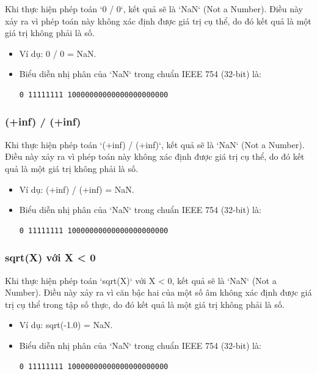 Khi thực hiện phép toán `0 / 0`, kết quả sẽ là `NaN` (Not a Number). Điều này xảy ra vì phép toán này không xác định được giá trị cụ thể, do đó kết quả là một giá trị không phải là số.

\begin{itemize}
	\item Ví dụ: 0 / 0 = NaN.
	\item Biểu diễn nhị phân của `NaN` trong chuẩn IEEE 754 (32-bit) là:
	      \begin{verbatim}
0 11111111 10000000000000000000000
\end{verbatim}
\end{itemize}

\subsubsection{(+inf) / (+inf)}

Khi thực hiện phép toán `(+inf) / (+inf)`, kết quả sẽ là `NaN` (Not a Number). Điều này xảy ra vì phép toán này không xác định được giá trị cụ thể, do đó kết quả là một giá trị không phải là số.

\begin{itemize}
	\item Ví dụ: (+inf) / (+inf) = NaN.
	\item Biểu diễn nhị phân của `NaN` trong chuẩn IEEE 754 (32-bit) là:
	      \begin{verbatim}
0 11111111 10000000000000000000000
\end{verbatim}
\end{itemize}

\subsubsection{sqrt(X) với X < 0}

Khi thực hiện phép toán `sqrt(X)` với X < 0, kết quả sẽ là `NaN` (Not a Number). Điều này xảy ra vì căn bậc hai của một số âm không xác định được giá trị cụ thể trong tập số thực, do đó kết quả là một giá trị không phải là số.

\begin{itemize}
	\item Ví dụ: sqrt(-1.0) = NaN.
	\item Biểu diễn nhị phân của `NaN` trong chuẩn IEEE 754 (32-bit) là:
	      \begin{verbatim}
0 11111111 10000000000000000000000
\end{verbatim}
\end{itemize}


